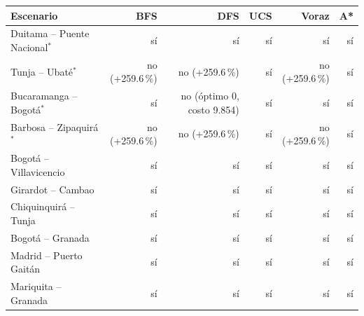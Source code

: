 \begin{tabular}{lrrrrr}
\toprule
\textbf{Escenario} & \textbf{BFS} & \textbf{DFS} & \textbf{UCS} & \textbf{Voraz} & \textbf{A*} \\
\midrule
Duitama -- Puente Nacional$^{*}$ & sí & sí & sí & sí & sí \\
Tunja -- Ubaté$^{*}$ & no (+259.6\,\%) & no (+259.6\,\%) & sí & no (+259.6\,\%) & sí \\
Bucaramanga -- Bogotá$^{*}$ & sí & no (óptimo $0$, costo 9.854) & sí & sí & sí \\
Barbosa -- Zipaquirá$^{*}$ & no (+259.6\,\%) & no (+259.6\,\%) & sí & no (+259.6\,\%) & sí \\
Bogotá -- Villavicencio & sí & sí & sí & sí & sí \\
Girardot -- Cambao & sí & sí & sí & sí & sí \\
Chiquinquirá -- Tunja & sí & sí & sí & sí & sí \\
Bogotá -- Granada & sí & sí & sí & sí & sí \\
Madrid -- Puerto Gaitán & sí & sí & sí & sí & sí \\
Mariquita -- Granada & sí & sí & sí & sí & sí \\
\bottomrule
\end{tabular}
